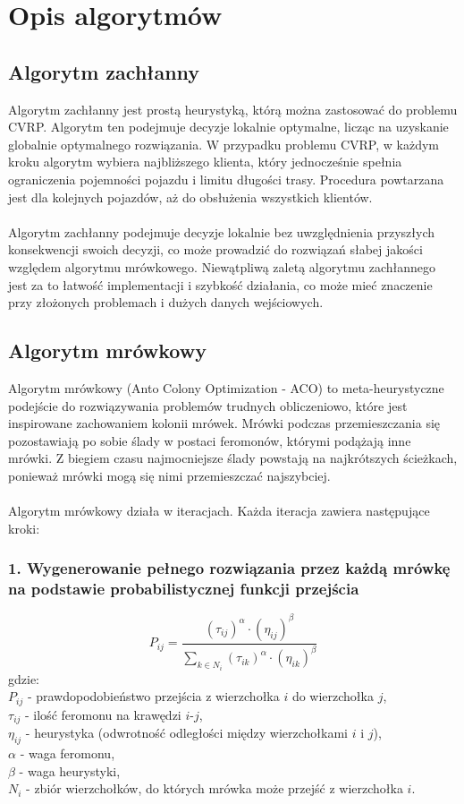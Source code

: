 \documentclass{article}
\begin{document}
\section{Opis algorytmów}
\subsection{Algorytm zachłanny}
Algorytm zachłanny jest prostą heurystyką, którą można zastosować do problemu CVRP. Algorytm ten podejmuje decyzje lokalnie optymalne, licząc na uzyskanie globalnie optymalnego rozwiązania. W  przypadku problemu CVRP, w każdym kroku algorytm wybiera najbliższego klienta, który jednocześnie spełnia ograniczenia pojemności pojazdu i limitu długości trasy. Procedura powtarzana jest dla kolejnych pojazdów, aż do obsłużenia wszystkich klientów.
\\ \\
Algorytm zachłanny podejmuje decyzje lokalnie bez uwzględnienia przyszłych konsekwencji swoich decyzji, co może prowadzić do rozwiązań słabej jakości względem algorytmu mrówkowego. Niewątpliwą zaletą algorytmu zachłannego jest za to łatwość implementacji i szybkość działania, co może mieć znaczenie przy złożonych problemach i dużych danych wejściowych.

\subsection{Algorytm mrówkowy}
Algorytm mrówkowy (Anto Colony Optimization - ACO) to meta-heurystyczne podejście do rozwiązywania problemów trudnych obliczeniowo, które jest inspirowane zachowaniem kolonii mrówek. Mrówki podczas przemieszczania się pozostawiają po sobie ślady w postaci feromonów, którymi podążają inne mrówki. Z biegiem czasu najmocniejsze ślady powstają na najkrótszych ścieżkach, ponieważ mrówki mogą się nimi przemieszczać najszybciej.
\\ \\
Algorytm mrówkowy działa w iteracjach. Każda iteracja zawiera następujące kroki:
\subsubsection*{1. Wygenerowanie pełnego rozwiązania przez każdą mrówkę na podstawie probabilistycznej funkcji przejścia}
\begin{equation}
    P_{ij} = \frac{(\tau_{ij})^\alpha \cdot (\eta_{ij})^\beta}{\sum_{k \in N_i} (\tau_{ik})^\alpha \cdot (\eta_{ik})^\beta}
\end{equation}
gdzie:
\\
$P_{ij}$ - prawdopodobieństwo przejścia z wierzchołka $i$ do wierzchołka $j$,
\\
$\tau_{ij}$ - ilość feromonu na krawędzi $i$-$j$,
\\
$\eta_{ij}$ - heurystyka (odwrotność odległości między wierzchołkami $i$ i $j$),
\\
$\alpha$ - waga feromonu,
\\
$\beta$ - waga heurystyki,
\\
$N_i$ - zbiór wierzchołków, do których mrówka może przejść z wierzchołka $i$.
\end{document}
